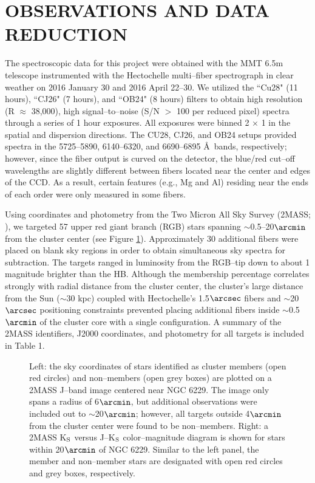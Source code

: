 \documentclass[12pt,preprint]{emulateapj}
\begin{document}
\section{OBSERVATIONS AND DATA REDUCTION}

The spectroscopic data for this project were obtained with the MMT 6.5m 
telescope instrumented with the Hectochelle multi--fiber spectrograph
\citep{Szentgyorgyi11} in clear weather on 2016 January 30 and 2016 
April 22--30.  We utilized the ``Cu28" (11 hours), ``CJ26" (7 hours), and
``OB24" (8 hours) filters to obtain high resolution (R $\approx$ 38,000), high 
signal--to--noise (S/N $>$ 100 per reduced pixel) spectra through a series of 
1 hour exposures.  All exposures were binned 2 $\times$ 1 in the spatial and
dispersion directions.  The CU28, CJ26, and OB24 setups provided spectra in the 
5725--5890, 6140--6320, and 6690--6895 \AA\ bands, respectively; however, 
since the fiber output is curved on the detector, the blue/red cut--off
wavelengths are slightly different between fibers located near the center and 
edges of the CCD.  As a result, certain features (e.g., Mg and Al) residing 
near the ends of each order were only measured in some fibers.

Using coordinates and photometry from the Two Micron All Sky Survey (2MASS; 
\citealt{Skrutskie06}), we targeted 57 upper red giant branch (RGB) stars
spanning $\sim$0.5--20$\arcmin$ from the cluster center (see Figure \ref{f1}).
Approximately 30 additional fibers were placed on blank sky regions in order
to obtain simultaneous sky spectra for subtraction.  The targets ranged in 
luminosity from the RGB--tip down to about 1 magnitude brighter than the HB.
Although the membership percentage correlates strongly with radial distance
from the cluster center, the cluster's large distance from the Sun ($\sim$30 
kpc) coupled with Hectochelle's 1.5$\arcsec$ fibers and $\sim$20$\arcsec$ 
positioning constraints prevented placing additional fibers inside 
$\sim$0.5$\arcmin$ of the cluster core with a single configuration.  A
summary of the 2MASS identifiers, J2000 coordinates, and photometry for all
targets is included in Table 1.

\begin{figure*}
\caption{Left: the sky coordinates of stars identified as cluster members (open
red circles) and non--members (open grey boxes) are plotted on a 2MASS J--band
image centered near NGC 6229.  The image only spans a radius of 6$\arcmin$,
but additional observations were included out to $\sim$20$\arcmin$; however,
all targets outside 4$\arcmin$ from the cluster center were found to be
non--members.  Right: a 2MASS K$_{\rm S}$ versus J--K$_{\rm S}$
color--magnitude diagram is shown for stars within 20$\arcmin$ of NGC 6229.
Similar to the left panel, the member and non--member stars are designated
with open red circles and grey boxes, respectively.}
\label{f1}
\end{figure*}
\end{document}

